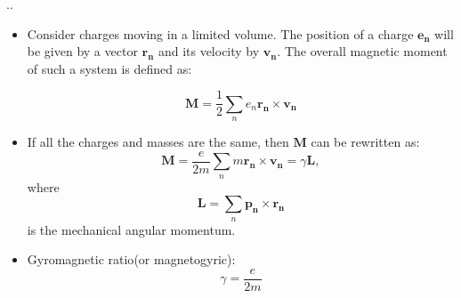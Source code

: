 \documentclass{beamer}
\begin{document}
\begin{frame}{\thesection.\thesubsection. \insertsubsection}
	
	\begin{itemize}[<+>]
		\item Consider charges moving in a limited volume. The position of a charge $\bm{e_n}$ will be given by a vector $\bm{r_n}$ and its velocity by $\bm{v_n}$. The overall magnetic moment of such a system is defined as:
			
			\begin{equation}
			\bm{M} = \frac{1}{2} \sum_{n} e_n\bm{r_n} \times \bm{v_n}
			\end{equation}
		\item 	If all the charges and masses are the same, then $\bm{M}$ can be rewritten as:	
			\begin{equation} \label{eq:1}
			\bm{M} = \frac{e}{2m} \sum_{n} m\bm{r_n} \times \bm{v_n} = \gamma \bm{L},
			\end{equation}
			where
			\begin{equation}
			\bm{L} = \sum_{n} \bm{p_n} \times \bm{r_n}
			\end{equation}
			is the mechanical angular momentum.
		\item 
			\alert{Gyromagnetic ratio}(or magnetogyric): 
			\begin{equation}
			\gamma = \dfrac{e}{2m}
			\end{equation}
			
	
	\end{itemize}
	


\end{frame}
\end{document}
